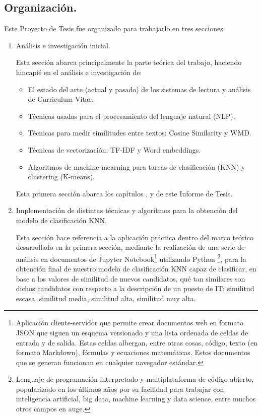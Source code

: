 \documentclass[12pt,a4paper]{article}
\begin{document}
\begin{sloppypar}
\subsection{Organización.}\label{organizacion}
Este Proyecto de Tesis fue organizado para trabajarlo en tres secciones:

\begin{enumerate}
\item Análisis e investigación inicial. 

Esta sección abarca principalmente la parte teórica del trabajo, haciendo hincapié en el análisis e investigación de:
\begin{itemize}
	\item El estado del arte (actual y pasado) de los sistemas de lectura y análisis de Curriculum Vitae.
	\item Técnicas usadas para el procesamiento del lenguaje natural (NLP).
	\item Técnicas para medir similitudes entre textos: Cosine Similarity y WMD.
	\item Técnicas de vectorización: TF-IDF y Word embeddings.
	\item Algoritmos de machine mearning para tareas de clasificación (KNN) y clustering (K-means).
\end{itemize} 

Esta primera sección abarca los capítulos \textit{}, \textit{} y \textit{} de este Informe de Tesis. \\

\item Implementación de distintas técnicas y algoritmos para la obtención del modelo de clasificación KNN. 

Esta sección hace referencia a la aplicación práctica dentro del marco teórico desarrollado en la primera sección, mediante la realización de una serie de análisis en documentos de Jupyter Notebook\footnote{Aplicación cliente-servidor que permite crear documentos web en formato JSON que siguen un esquema versionado y una lista ordenada de celdas de entrada y de salida. Estas celdas albergan, entre otras cosas, código, texto (en formato Markdown), fórmulas y ecuaciones matemáticas. Estos documentos que se generan funcionan en cualquier navegador estándar.} utilizando Python \footnote{Lenguaje de programación interpretado y multiplataforma de código abierto, popularizado en los últimos años por su facilidad para trabajar con inteligencia artificial, big data, machine learning y data science, entre muchos otros campos en auge.}, para la obtención final de nuestro modelo de clasificación KNN capaz de clasificar, en base a los valores de similitud de nuevos candidatos, qué tan similares son dichos candidatos con respecto a la descripción de un puesto de IT: similitud escasa, similitud media, similitud alta, similitud muy alta. 


\end{enumerate}
\end{sloppypar}
\end{document}
